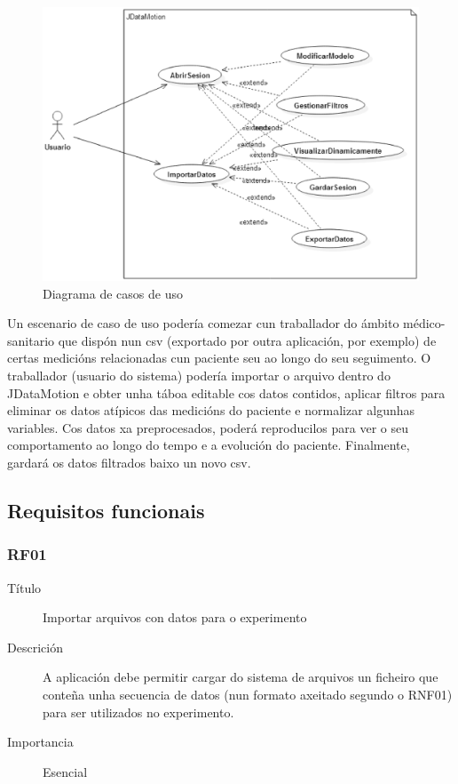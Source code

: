 \begin{figure}
\centering
\includegraphics[width=\textwidth,height=\textheight,keepaspectratio]{figuras/casosUso}
\caption{Diagrama de casos de uso}
\label{casosUso}
\end{figure}

Un escenario de caso de uso podería comezar cun traballador do ámbito médico-sanitario que dispón nun csv (exportado por outra aplicación, por exemplo) de certas medicións relacionadas cun paciente seu ao longo do seu seguimento. O traballador (usuario do sistema) podería importar o arquivo dentro do JDataMotion e obter unha táboa editable cos datos contidos, aplicar filtros para eliminar os datos atípicos das medicións do paciente e normalizar algunhas variables. Cos datos xa preprocesados, poderá reproducilos para ver o seu comportamento ao longo do tempo e a evolución do paciente. Finalmente, gardará os datos filtrados baixo un novo csv.

\subsection{Requisitos funcionais}

\subsubsection*{RF01}
\begin{description}
\item[Título] \hfill
Importar arquivos con datos para o experimento
\item[Descrición] \hfill
A aplicación debe permitir cargar do sistema de arquivos un ficheiro que conteña unha secuencia de datos (nun formato axeitado segundo o RNF01) para ser utilizados no experimento.
\item[Importancia] \hfill
Esencial
\end{description}

